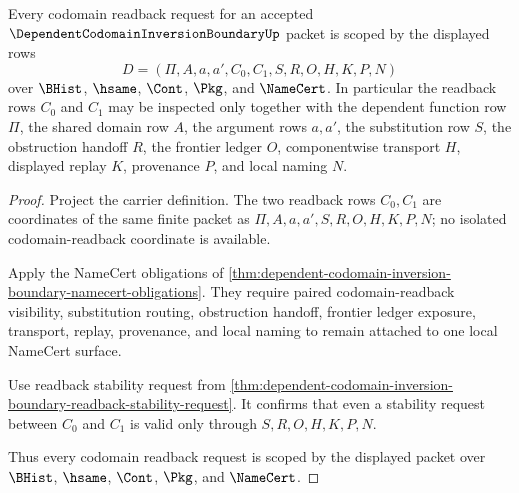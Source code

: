 \begin{theorem}
\label{thm:dependent-codomain-inversion-boundary-codomain-scope}
Every codomain readback request for an accepted $\DependentCodomainInversionBoundaryUp$ packet is scoped by the displayed rows
$$
D=(\Pi,A,a,a',C_0,C_1,S,R,O,H,K,P,N)
$$
over $\BHist$, $\hsame$, $\Cont$, $\Pkg$, and $\NameCert$. In particular the readback rows $C_0$ and $C_1$ may be inspected only together with the dependent function row $\Pi$, the shared domain row $A$, the argument rows $a,a'$, the substitution row $S$, the obstruction handoff $R$, the frontier ledger $O$, componentwise transport $H$, displayed replay $K$, provenance $P$, and local naming $N$.
\end{theorem}
\begin{proof}
Project the carrier definition. The two readback rows $C_0,C_1$ are coordinates of the same finite packet as $\Pi,A,a,a',S,R,O,H,K,P,N$; no isolated codomain-readback coordinate is available.

Apply the NameCert obligations of \autoref{thm:dependent-codomain-inversion-boundary-namecert-obligations}. They require paired codomain-readback visibility, substitution routing, obstruction handoff, frontier ledger exposure, transport, replay, provenance, and local naming to remain attached to one local NameCert surface.

Use readback stability request from \autoref{thm:dependent-codomain-inversion-boundary-readback-stability-request}. It confirms that even a stability request between $C_0$ and $C_1$ is valid only through $S,R,O,H,K,P,N$.

Thus every codomain readback request is scoped by the displayed packet over $\BHist$, $\hsame$, $\Cont$, $\Pkg$, and $\NameCert$.
\end{proof}

